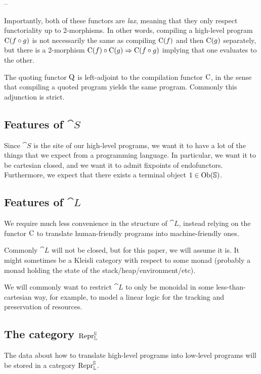 --

Importantly, both of these functors are \emph{lax}, meaning that they only
respect functoriality up to 2-morphisms. In other words, compiling a high-level
program $\mathrm C(f \circ g)$ is not necessarily the same as compiling $\mathrm
  C(f)$ and then $\mathrm C(g)$ separately, but there is a 2-morphism $\mathrm C(f)
  \circ \mathrm C(g) \Rightarrow \mathrm C(f \circ g)$ implying that one evaluates to
the other.

The quoting functor $\mathrm Q$ is left-adjoint to the compilation functor $\mathrm
  C$, in the sense that compiling a quoted program yields the same program.
Commonly this adjunction is strict.

\subsection{Features of $\cat S$}

Since $\cat S$ is the site of our high-level programs, we want it to have a lot
of the things that we expect from a programming language. In particular, we
want it to be cartesian closed, and we want it to admit fixpoints of
endofunctors. Furthermore, we expect that there exists a terminal object $1 \in
  \mathrm{Ob}(\mathbb S)$.

\subsection{Features of $\cat L$}

We require much less convenience in the structure of $\cat L$, instead relying
on the functor $\mathrm C$ to translate human-friendly programs into
machine-friendly ones.

Commonly $\cat L$ will not be closed, but for this paper, we will assume it is.
It might sometimes be a Kleisli category with respect to some monad (probably a
monad holding the state of the stack/heap/environment/etc).

We will commonly want to restrict $\cat L$ to only be monoidal in some
less-than-cartesian way, for example, to model a linear logic for the tracking
and preservation of resources.

\subsection{The category $\mathrm{Repr} _{\mathbb L} ^{\mathbb S}$}

The data about how to translate high-level programs into low-level programs
will be stored in a category $\mathrm{Repr} _{\mathbb L} ^{\mathbb S}$.

